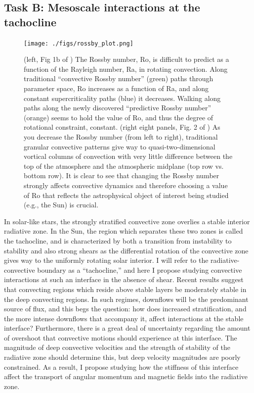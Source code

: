 \documentclass[aasms,12pt]{article}
\begin{document}
\subsection{Task B: Mesoscale interactions at the tachocline}
\begin{figure}[t!]
    \texttt{[image: ./figs/rossby\_plot.png]}
    \caption{(left, Fig 1b of \citet{anders&all2019}) The Rossby number, Ro, is difficult to predict as a function of the Rayleigh number, Ra, in rotating convection.
	Along traditional ``convective Rossby number'' (green) paths through parameter space, Ro increases as a function of Ra, and along constant supercriticality paths (blue) it decreases.
	Walking along paths along the newly discovered ``predictive Rossby number'' (orange) seems to hold the value of Ro, and thus the degree of rotational constraint, constant.
	(right eight panels, Fig. 2 of \citet{anders&all2019}) As you decrease the Rossby number (from left to right), traditional granular convective patterns give way to quasi-two-dimensional vortical columns of convection with very little difference between the top of the atmosphere and the atmospheric midplane (top row vs. bottom row).
	It is clear to see that changing the Rossby number strongly affects convective dynamics and therefore choosing a value of Ro that reflects the astrophysical object of interest being studied (e.g., the Sun) is crucial.
	\label{fig:rossby_plot} }
\end{figure}

In solar-like stars, the strongly stratified convective zone overlies a stable interior radiative zone.
In the Sun, the region which separates these two zones is called the tachocline, and is characterized by both a transition from instability to stability and also strong shears as the differential rotation of the convective zone gives way to the uniformly rotating solar interior.
I will refer to the radiative-convective boundary as a ``tachocline,'' and here I propose studying convective interactions at such an interface in the absence of shear. 
Recent results suggest that convecting regions which reside above stable layers be moderately stable in the deep convecting regions.
In such regimes, downflows will be the predominant source of flux, and this begs the question: how does increased stratification, and the more intense downflows that accompany it, affect interactions at the stable interface?
Furthermore, there is a great deal of uncertainty regarding the amount of overshoot that convective motions should experience at this interface.
The magnitude of deep convective velocities and the strength of stability of the radiative zone should determine this, but deep velocity magnitudes are poorly constrained.
As a result, I propose studying how the stiffness \citep[or, whether or not convective motions can penetrate the stable region, as in][]{couston&all2017} of this interface affect the transport of angular momentum and magnetic fields into the radiative zone.
\end{document}
